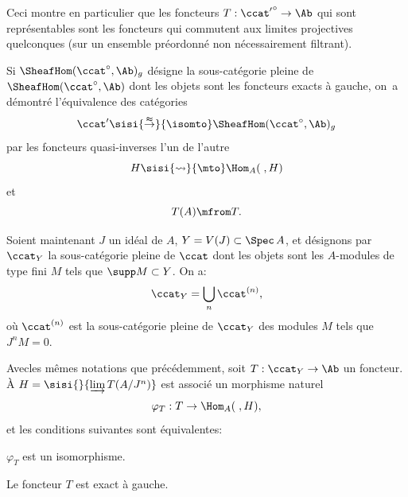 \begin{remarque} \label{IV.1.2}
Ceci montre en particulier que les foncteurs $T:{\ccat'}^{\circ}\to \Ab$ qui sont repr\'esentables sont les foncteurs qui commutent aux limites projectives quelconques (sur un ensemble pr\'eordonn\'e non n\'ecessairement filtrant).
\end{remarque}

Si $\SheafHom (\ccat^{\circ}, \Ab)_{g}$ d\'esigne la sous-cat\'egorie pleine de $\SheafHom (\ccat^{\circ}, \Ab)$ dont les objets sont les foncteurs exacts \`a gauche, on~a d\'emontr\'e l'\'equivalence des cat\'egories
\[
\ccat' \sisi{\overset{\thickapprox}{\to}}{\isomto} \SheafHom (\ccat^{\circ}, \Ab)_{g}
\]
par les foncteurs quasi-inverses l'un de l'autre
\[
H \sisi{\rightsquigarrow}{\mto}\Hom_{A}(\;, H)
\]
et
\[
T(A) \mfrom T.
\]

Soient maintenant $J$ un id\'eal de $A$, $Y=V(J)\subset \Spec\, A$, et d\'esignons par $\ccat_{Y}$ la sous-cat\'egorie pleine de $\ccat$ dont les objets sont les $A$-modules de type fini $M$ tels que $\supp M\subset Y$. On a:
\[
\ccat_{Y}=\bigcup_{n}\ccat^{(n)},
\]
o\`u $\ccat^{(n)}$ est la sous-cat\'egorie pleine de $\ccat_{Y}$ des modules $M$ tels que $J^{n}M=0$.

\begin{proposition} \label{IV.1.3}
Avec\pageoriginale les m\^emes notations que pr\'ec\'edemment, soit $T:\ccat_{Y}\to \Ab$ un foncteur. \`A $H=\sisi{}{\varinjlim T(A/J^n)}$ est associ\'e un morphisme naturel
\[
\varphi_{T}: T\to \Hom_{A}(\;, H),
\]
et les conditions suivantes sont \'equivalentes:
\begin{enumeratei}
\item
$\varphi_{T}$ est un isomorphisme.

\item
Le foncteur $T$ est exact \`a gauche.
\end{enumeratei}
\end{proposition}

